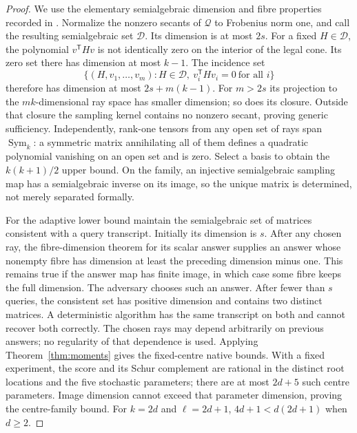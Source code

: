 \documentclass[11pt,reqno]{amsart}
\numberwithin{equation}{section}
\theoremstyle{definition}
\theoremstyle{remark}
\newcommand{\Sym}{\operatorname{Sym}}
\newcommand{\cQ}{\mathscr Q}
\begin{document}
\begin{proof}
We use the elementary semialgebraic dimension and fibre properties recorded in \cite[Chapters 2 and 9]{BCR}. Normalize the nonzero secants of $\cQ$ to Frobenius norm one, and call the resulting semialgebraic set $\mathcal D$. Its dimension is at most $2s$. For a fixed $H\in\mathcal D$, the polynomial $v^{\mathsf T}Hv$ is not identically zero on the interior of the legal cone. Its zero set there has dimension at most $k-1$. The incidence set
\[
 \{(H,v_1,\ldots,v_m):H\in\mathcal D,\ v_i^{\mathsf T}Hv_i=0\ \text{for all }i\}
\]
therefore has dimension at most $2s+m(k-1)$. For $m>2s$ its projection to the $mk$-dimensional ray space has smaller dimension; so does its closure. Outside that closure the sampling kernel contains no nonzero secant, proving generic sufficiency. Independently, rank-one tensors from any open set of rays span $\Sym_k$: a symmetric matrix annihilating all of them defines a quadratic polynomial vanishing on an open set and is zero. Select a basis to obtain the $k(k+1)/2$ upper bound. On the family, an injective semialgebraic sampling map has a semialgebraic inverse on its image, so the unique matrix is determined, not merely separated formally.

For the adaptive lower bound maintain the semialgebraic set of matrices consistent with a query transcript. Initially its dimension is $s$. After any chosen ray, the fibre-dimension theorem for its scalar answer supplies an answer whose nonempty fibre has dimension at least the preceding dimension minus one. This remains true if the answer map has finite image, in which case some fibre keeps the full dimension. The adversary chooses such an answer. After fewer than $s$ queries, the consistent set has positive dimension and contains two distinct matrices. A deterministic algorithm has the same transcript on both and cannot recover both correctly. The chosen rays may depend arbitrarily on previous answers; no regularity of that dependence is used. Applying Theorem~\ref{thm:moments} gives the fixed-centre native bounds. With a fixed experiment, the score and its Schur complement are rational in the distinct root locations and the five stochastic parameters; there are at most $2d+5$ such centre parameters. Image dimension cannot exceed that parameter dimension, proving the centre-family bound. For $k=2d$ and $\ell=2d+1$, $4d+1<d(2d+1)$ when $d\ge2$.
\end{proof}
\end{document}

